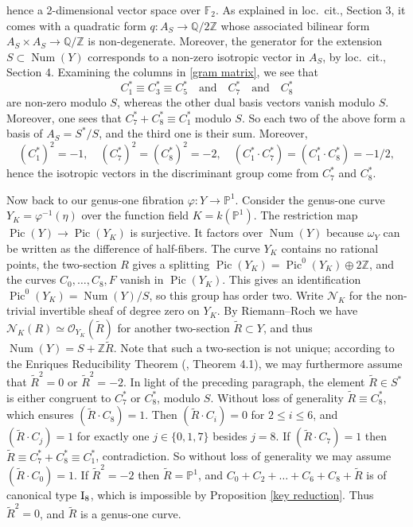 \documentclass[oneside, 12pt]{amsart}
\theoremstyle{definition}
\theoremstyle{remark}
\newcommand{\ZZ}{\mathbb{Z}}
\newcommand{\QQ}{\mathbb{Q}}
\newcommand{\FF}{\mathbb{F}}
\newcommand{\PP}{\mathbb{P}}
\newcommand{\shN}{\mathscr{N}}
\newcommand{\I}{\text{\rm I}}
\newcommand{\Num}{\operatorname{Num}}
\renewcommand{\O}{\mathscr{O}}
\newcommand{\Pic}{\operatorname{Pic}}
\newcommand{\quadand}{\quad\text{and}\quad}
\newcommand{\ra}{\rightarrow}
\newcommand{\inv}{{-1}}
\begin{document}
hence a 2-dimensional vector space over $\FF_2$.
% 
% 
As explained in loc.\ cit., Section 3,
it comes with a  quadratic form $q:A_S\ra\QQ/2\ZZ$ whose associated bilinear form $A_S\times A_S\ra\QQ/\ZZ$ is non-degenerate.
Moreover, the generator for the extension $S\subset\Num(Y)$   corresponds  to a non-zero isotropic vector in $A_S$, by loc.\ cit., Section 4. 
Examining the columns in  \eqref{gram matrix},  we see that 
$$
C_1^*\equiv C_3^*\equiv C_5^*\quadand C_7^*\quadand C_8^* 
$$
are non-zero modulo $S$, whereas the other dual basis vectors vanish modulo  $S$. Moreover, one sees that $C_7^*+C_8^*\equiv C^*_1$ modulo $S$.
So each two of the above  form a basis of $A_S=S^*/S$, and the third one is their sum. Moreover,
$$
(C_1^*)^2=-1,\quad (C_7^*)^2=(C_8^*)^2=-2,\quad (C_1^*\cdot C_7^*)=(C_1^*\cdot C_8^*)=-1/2,
$$
hence the isotropic vectors in the discriminant group come from $C_7^*$ and $C_8^*$. 
 
\newcommand{\tR}{\tilde{R}}
Now back to our genus-one fibration $\varphi:Y\ra\PP^1$.
Consider the    genus-one curve $Y_K=\varphi^\inv(\eta)$ over the function field  $K=k(\PP^1)$.
The restriction map  $\Pic(Y)\ra\Pic(Y_K)$  is surjective. It factors over $\Num(Y)$  because
$\omega_Y$ can be written as the difference of half-fibers. 
The curve $Y_K$ contains no rational points,   the two-section $R$ gives a splitting $\Pic(Y_K)=\Pic^0(Y_K)\oplus 2\ZZ$,
and the curves $C_0,\ldots,C_8,F$ vanish in $\Pic(Y_K)$. This gives an identification $\Pic^0(Y_K)=\Num(Y)/S$, so this group has order two.
Write $\shN_K$ for the non-trivial invertible sheaf of degree zero on $Y_K$.
By Riemann--Roch we have $\shN_K(R)\simeq\O_{Y_K}(\tR)$ for another  two-section $\tR\subset Y$, and thus  $\Num(Y)=S+\ZZ\tR$.
Note that such a  two-section is not unique;
according to the Enriques Reducibility Theorem (\cite{Lang 1983}, Theorem 4.1), we may furthermore assume that $\tR^2=0$ or $\tR^2=-2$.
In light of the preceding paragraph, the element $\tR\in S^*$
is either congruent  to $C_7^*$ or $C_8^*$, modulo $S$.
Without loss of generality $\tR\equiv C_8^*$, which ensures $(\tR\cdot C_8)=1$.
Then $(\tR\cdot C_i)=0$ for $2\leq i\leq 6$, and $(\tR\cdot C_j)=1$ for exactly one $j\in\{0,1,7\}$ besides $j=8$. 
If $(\tR\cdot C_7)=1$ then $\tR\equiv C_7^*+C^*_8\equiv C_1^*$, contradiction.
So without loss of generality we may assume  $(\tR\cdot C_0)=1$. 
If $\tR^2=-2$ then $\tR=\PP^1$, and  $C_0+C_2+\ldots+C_6+C_8+\tR$ is of canonical type $\I_8$, which is impossible by Proposition \ref{key reduction}.
Thus $\tR^2=0$, and $\tR$ is a genus-one curve.
\end{document}
